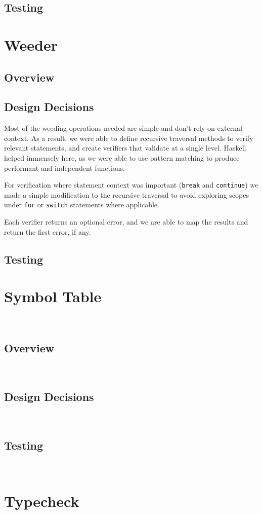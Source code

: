 \documentclass[11pt]{article}
\begin{document}
\subsection{Testing}
\section{Weeder}
\subsection{Overview}
\subsection{Design Decisions}
Most of the weeding operations needed are simple and don't rely
on external context. As a result, we were able to define recursive
traversal methods to verify relevant statements, and create verifiers
that validate at a single level. Haskell helped immensely here, as
we were able to use pattern matching to produce performant and
independent functions.

For verification where statement context was important (\texttt{break} and
\texttt{continue}) we made a simple modification to the recursive traversal
to avoid exploring scopes under \texttt{for} or \texttt{switch} statements
where applicable.

Each verifier returns an optional error, and we are able to map the
results and return the first error, if any.

\subsection{Testing}
\section{Symbol Table}~%
\subsection{Overview}~%
\subsection{Design Decisions}~%
\subsection{Testing}~%
\section{Typecheck}~%
\end{document}
